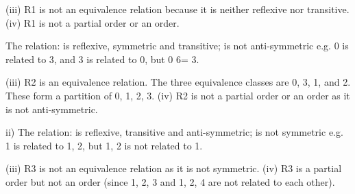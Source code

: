 \begin{frame}
(iii) R1 is not an equivalence relation because it is neither reflexive
nor transitive.
(iv) R1 is not a partial order or an order.
\end{frame}
\begin{frame}
The relation:
is reflexive, symmetric and transitive;
is not anti-symmetric e.g. 0 is related to 3, and 3 is related to 0,
but 0 6= 3.
\end{frame}
\begin{frame}
(iii) R2 is an equivalence relation. The three equivalence classes are
{0, 3}, {1}, and {2}. These form a partition of {0, 1, 2, 3}.
(iv) R2 is not a partial order or an order as it is not anti-symmetric.
\end{frame}

\begin{frame}
ii) The relation:
is reflexive, transitive and anti-symmetric;
is not symmetric e.g. {1} is related to {1, 2}, but {1, 2} is not
related to {1}.
\end{frame}
\begin{frame}
(iii) R3 is not an equivalence relation as it is not symmetric.
(iv) R3 is a partial order but not an order (since {1, 2, 3} and {1, 2, 4}
are not related to each other).
\end{frame}
